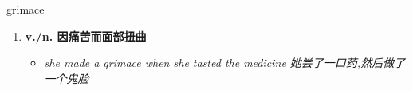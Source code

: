 
\begin{frame}
{\huge grimace}
\begin{center}
\begin{enumerate}\Large
  \item \textbf{v./n. 因痛苦而面部扭曲}
  \begin{itemize}
    \item \em{\Large{she made a grimace when she tasted the medicine 她尝了一口药,然后做了一个鬼脸}}
  \end{itemize}
\end{enumerate}
\end{center}
\end{frame}
